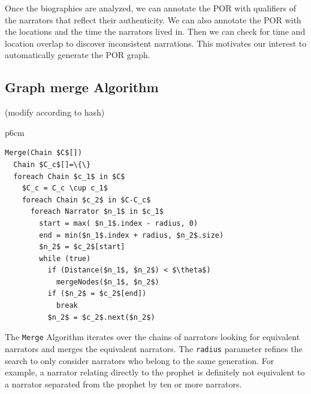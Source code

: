 \documentclass[11pt]{article}
\newcommand{\CodeIn}[1]{{\small\texttt{#1}}}
\begin{document}
Once the biographies are analyzed, we can annotate
the POR with qualifiers of the narrators that reflect
their authenticity. 
We can also annotate the POR with the locations and 
the time the narrators lived in. 
Then we can check for time and location overlap
to discover inconsistent narrations.
This motivates our interest to automatically generate 
the POR graph.


\subsection{Graph merge Algorithm}

(modify according to hash)

\begin{table}[tb]
\begin{tabular} {p{6cm}}
\begin{Verbatim}[fontsize=\relsize{-2},
frame=topline,framesep=4mm,label=\fbox{Merge Algorithm},
commandchars=\\\{\}, codes={\catcode`$=3\catcode`_=8}]
Merge(Chain $C$[])
  Chain $C_c$[]=\{\}
  foreach Chain $c_1$ in $C$ 
    $C_c = C_c \cup c_1$
    foreach Chain $c_2$ in $C-C_c$
      foreach Narrator $n_1$ in $c_1$
        start = max( $n_1$.index - radius, 0)
        end = min($n_1$.index + radius, $n_2$.size)
        $n_2$ = $c_2$[start]
        while (true)
          if (Distance($n_1$, $n_2$) < $\theta$)
            mergeNodes($n_1$, $n_2$)
          if ($n_2$ = $c_2$[end])
            break
          $n_2$ = $c_2$.next($n_2$)        
\end{Verbatim}
\end{tabular}
\label{t:merge}
\end{table}


The \CodeIn{Merge} Algorithm 
iterates over the chains of narrators looking 
for equivalent narrators and merges the equivalent
narrators.
The \CodeIn{radius} parameter refines the search 
to only consider narrators who belong to the same 
generation. 
For example, a narrator relating directly to the prophet
is definitely not equivalent to a narrator separated
from the prophet by ten or more narrators. 
\end{document}

